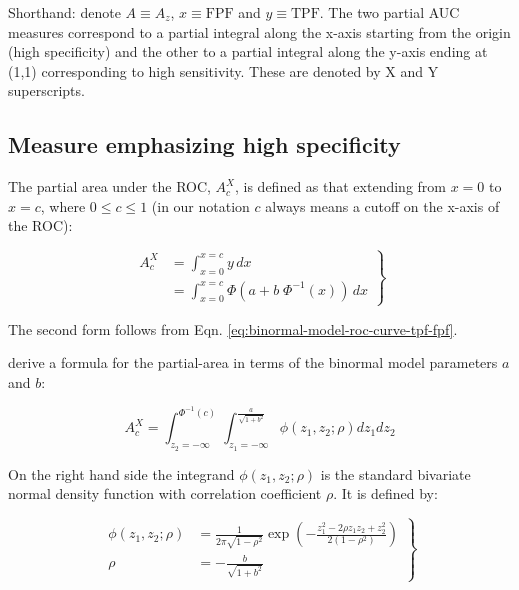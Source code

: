 \documentclass[
]{book}
\begin{document}
Shorthand: denote \(A \equiv A_z\), \(x \equiv \text{FPF}\) and \(y \equiv \text{TPF}\). The two partial AUC measures correspond to a partial integral along the x-axis starting from the origin (high specificity) and the other to a partial integral along the y-axis ending at (1,1) corresponding to high sensitivity. These are denoted by X and Y superscripts.

\hypertarget{binormal-model-meaning-partial-auc-definitions}{%
\subsection{Measure emphasizing high specificity}\label{binormal-model-meaning-partial-auc-definitions}}

The partial area under the ROC, \(A_c^{X}\), is defined as that extending from \(x = 0\) to \(x = c\), where \(0 \le c \le 1\) (in our notation \(c\) always means a cutoff on the x-axis of the ROC):

\begin{equation} 
\left. 
\begin{aligned}
A_c^{X} &= \int_{x=0}^{x=c} y \, dx 
\\&=  \int_{x=0}^{x=c} \Phi\left ( a + b \; \Phi^{-1} \left ( x \right ) \right ) \, dx 
\end{aligned}
\right \}
\label{eq:binormal-model-partial-area-a1}
\end{equation}

The second form follows from Eqn. \eqref{eq:binormal-model-roc-curve-tpf-fpf}.

\citep{thompson1989statistical} derive a formula for the partial-area in terms of the binormal model parameters \(a\) and \(b\):

\begin{equation}
A_c^{X} = \int_{z_2=-\infty}^{\Phi^{-1}\left ( c \right )}   \int_{z_1=-\infty}^{\frac{a}{\sqrt{1+b^2}}} \phi\left ( z_1,z_2;\rho \right ) dz_1dz_2
\label{eq:binormal-model-partial-area-final}
\end{equation}

On the right hand side the integrand \(\phi\left ( z_1,z_2;\rho \right )\) is the standard bivariate normal density function with correlation coefficient \(\rho\). It is defined by:

\begin{equation}
\left. 
\begin{aligned}
\phi\left (z_1,z_2;\rho \right ) &= \frac{1}{2 \pi \sqrt{1-\rho^2}} \exp\left ( -\frac{z_1^2 -2\rho z_1 z_2 +z_2^2}{2\left ( 1-\rho^2 \right )} \right ) \\
\rho &= - \frac{b}{\sqrt{1+b^2}}
\end{aligned}
\right \}
\label{eq:binormal-model-bivariate-density}
\end{equation}
\end{document}
